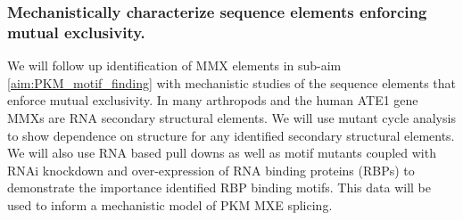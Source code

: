 \documentclass{article}
\begin{document}
\subsubsection{Mechanistically characterize sequence elements enforcing mutual exclusivity.} \label{aim:PKM_mechanistic}
We will follow up identification of MMX elements in sub-aim \ref{aim:PKM_motif_finding} with mechanistic studies of the sequence elements that enforce mutual exclusivity. 
In many arthropods and the human ATE1 gene \cite{Graveley2005-oi, Jin2018-tq, Kalinina2021-jt} MMXs are RNA secondary structural elements. 
We will use mutant cycle analysis to show dependence on structure for any identified secondary structural elements. 
We will also use RNA based pull downs as well as motif mutants coupled with RNAi knockdown and over-expression of RNA binding proteins (RBPs) to demonstrate the importance identified RBP binding motifs.
This data will be used to inform a mechanistic model of PKM MXE splicing.







\printbibliography
\end{document}
